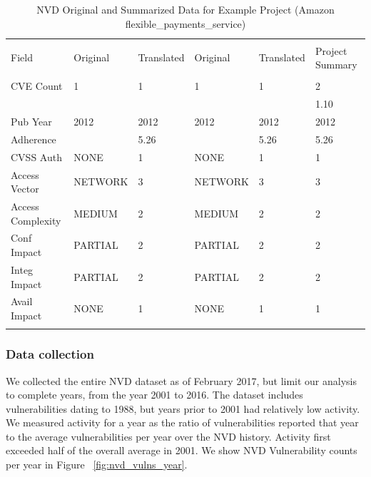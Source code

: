 \begin{table}
	\begin{center}	
		\caption{NVD Original and Summarized Data for Example Project (Amazon flexible\_payments\_service)}
		\label{tab:nvd_data_examples}
		\begin{scriptsize}
			\begin{tabular}{p{3cm}p{1.5cm}p{1cm}p{1.5cm}p{1cm}p{1cm}}
				&&&&&\\[-1.8ex]\hline 
				\hline &&&&\\[-1.8ex] 
				Field & Original & Translated & Original & Translated & Project Summary \\
				\hline &&&&&\\[-1.8ex] 				
				CVE Count &  1 & 1 & 1 & 1 & 2\\
				&&&&& 1.10\\
				Pub Year & 2012 & 2012 & 2012 & 2012 & 2012\\
				Adherence & & 5.26 & & 5.26 & 5.26 \\				
				CVSS Auth & NONE & 1 & NONE & 1 & 1 \\
				Access Vector & NETWORK & 3 & NETWORK & 3 & 3 \\
				Access Complexity & MEDIUM & 2 & MEDIUM & 2 & 2 \\
				Conf Impact & PARTIAL & 2 & PARTIAL & 2 & 2\\
				Integ Impact & PARTIAL & 2 & PARTIAL & 2 & 2\\
				Avail Impact & NONE & 1 & NONE & 1 & 1 \\
				\hline &&&&&\\[-1.8ex] 		
			\end{tabular}
		\end{scriptsize}
	\end{center}
\end{table}			
			
\subsubsection{Data collection}
We collected the entire NVD dataset as of February 2017, but limit our analysis to complete years, from the year 2001 to 2016. The dataset includes vulnerabilities dating to 1988, but years prior to 2001 had relatively low activity. We measured activity for a year as the ratio of vulnerabilities reported that year to the average vulnerabilities per year over the NVD history. Activity first exceeded half of the overall average in 2001. We show NVD Vulnerability counts per year in Figure ~\ref{fig:nvd_vulns_year}.

